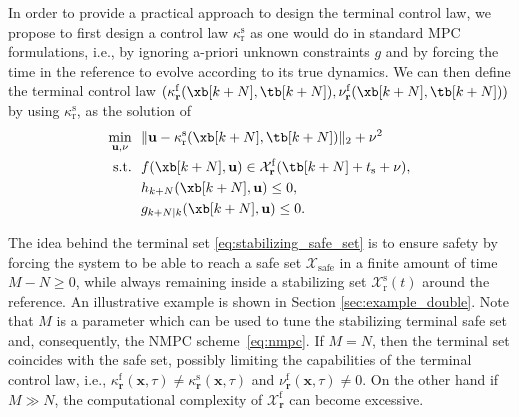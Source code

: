 \documentclass[journal]{IEEEtran}
\newcommand{\x}{{\mathbf{x}}}
\renewcommand{\u}{{\mathbf{u}}}
\renewcommand{\r}{{\mathbf{r}}}
\begin{document}
	In order to provide a practical approach to design the terminal control law, we propose to first design a control law $\kappa_\mathrm{r}^\mathrm{s}$ as one would do in standard MPC formulations, i.e., by ignoring a-priori unknown constraints $g$ and by forcing the time in the reference to evolve according to its true dynamics. We can then define the terminal control law $(\kappa^\mathrm{f}_\r(\xb[k+N],\tb[k+N]),\nu_\r^\mathrm{f}(\xb[k+N],\tb[k+N]))$ by using $\kappa_\mathrm{r}^\mathrm{s}$, as the solution of
	\begin{subequations}\label{eq:terminal_controller_min}
	\begin{align}
		\min_{\u,\nu} \ \ & \|\u-\kappa_\mathrm{r}^\mathrm{s}(\xb[k+N],\tb[k+N])\|_2 + \nu^2 \\
		\mathrm{s.t.} \ \ &f(\xb[k+N],\u)\in\mathcal{X}_\r^\mathrm{f}(\tb[k+N]+t_\mathrm{s}+\nu), \\
		& h_{k+N}(\xb[k+N],\u) \leq0, \\
		& g_{k+N|k}(\xb[k+N],\u) \leq0.
		\end{align}
	\end{subequations}
	

	The idea behind the terminal set  \eqref{eq:stabilizing_safe_set} is to ensure safety by forcing the system to be able to reach a safe set $\mathcal{X}_\mathrm{safe}$ in a finite amount of time $M-N\geq{}0$, while always remaining inside a stabilizing set $\mathcal{X}_\mathrm{r}^\mathrm{s}(t)$ around the reference. An illustrative example is shown in Section \ref{sec:example_double}. Note that $M$ is a parameter which can be used to tune the stabilizing terminal safe set and, consequently, the NMPC scheme~\eqref{eq:nmpc}. If $M=N$, then the terminal set coincides with the safe set, possibly limiting the  capabilities of the terminal control law, i.e., $\kappa_\r^\mathrm{f}(\x,\tau)\neq\kappa_\r^\mathrm{s}(\x,\tau)$ and $\nu_\r^\mathrm{f}(\x,\tau)\neq{}0$. On the other hand if $M \gg N$, the computational complexity of $\mathcal{X}_\r^\mathrm{f}$ can become excessive. 



	
	
	
\end{document}
